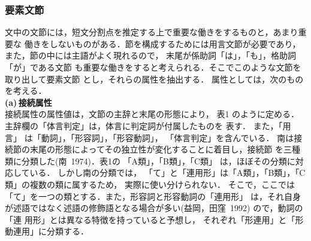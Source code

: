 \subsubsection{要素文節}
文中の文節には，短文分割点を推定する上で重要な働きをするものと，あまり重要な
働きをしないものがある．節を構成するためには用言文節が必要であり，
また，節の中には主語がよく現れるので，
末尾が係助詞「は」，「も」，格助詞 「が」である文節
も重要な働きをすると考えられる．そこでこのような文節を取り出して要素文節
とし，それらの属性を抽出する．
属性としては，次のものを考える．
\vspace*{2mm}\\
\noindent
{\bf (a)\,接続属性\\}
接続属性の属性値は，文節の主辞と末尾の形態により，
表1 のように定める．
主辞欄の「体言判定」は，体言に判定詞が付属したものを
表す．
また，「用言」 は「動詞」，「形容詞」，「形容動詞」，
「体言判定」を含んでいる．
南は接続節の末尾の形態によってその独立性が変化することに着目し，接続節
を三種類に分類した(南\  1974)．表1の
 「A類」，「B類」，「C類」 は，ほぼその分類に対応している．
しかし南の分類では，
「て」と「連用形」は「A類」，「B類」，「C類」の複数の類に属するため，
実際に使い分けられない．
そこで，ここでは「て」を一つの類とする．また，形容詞と形容動詞の「連用形」
は，それ自身が述語ではなく述語の修飾語となる場合が多い(益岡，田窪\  1992)
ので，動詞の「連
用形」とは異なる特徴を持っていると予想し，
それぞれ「形連用」と「形動連用」に分類する．
